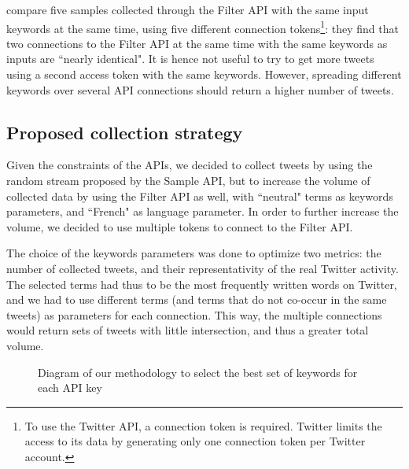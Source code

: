 \citet{joseph_two_2014} compare five samples collected through the Filter API with the same input keywords at the same time, using five different connection tokens\footnote{To use the Twitter API, a connection token is required. Twitter limits the access to its data by generating only one connection token per Twitter account.}: they find that two connections to the Filter API at the same time with the same keywords as inputs are ``nearly identical". It is hence not useful to try to get more tweets using a second access token with the same keywords. However, spreading different keywords over several API connections should return a higher number of tweets.

\subsection{Proposed collection strategy \label{Subsec: collection strategy}}

Given the constraints of the APIs, we decided to collect tweets by using the random stream proposed by the Sample API, but to increase the volume of collected data by using the Filter API as well, with ``neutral" terms as keywords parameters, and ``French" as language parameter.  In order to further increase the volume, we decided to use multiple tokens to connect to the Filter API. 



The choice of the keywords parameters was done to optimize two metrics: the number of collected tweets, and their representativity of the real Twitter activity. The selected terms had thus to be the most frequently written words on Twitter, and we had to use different terms (and terms that do not co-occur in the same tweets) as parameters for each connection. This way, the multiple connections would return sets of tweets with little intersection, and thus a greater total volume.


\begin{figure}
\caption{Diagram of our methodology to select the best set of keywords for each API key}
\label{Figure:ExperimentalSetup}
\end{figure}

